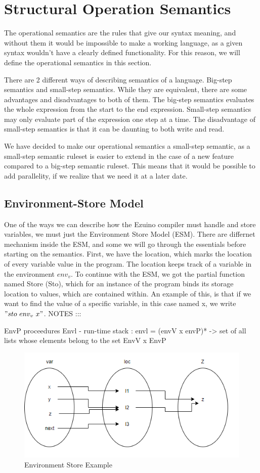\section{Structural Operation Semantics}
The operational semantics are the rules that give our syntax meaning, and without them it would be impossible to make a working language, as a given syntax wouldn't have a clearly defined functionality. For this reason, we will define the operational semantics in this section.

There are 2 different ways of describing semantics of a language. Big-step semantics and small-step semantics. While they are equivalent, there are some advantages and disadvantages to both of them. The big-step semantics evaluates the whole expression from the start to the end expression. Small-step semantics may only evaluate part of the expression one step at a time. The disadvantage of small-step semantics is that it can be daunting to both write and read.

We have decided to make our operational semantics a small-step semantic, as a small-step semantic ruleset is easier to extend in the case of a new feature compared to a big-step semantic ruleset. This means that it would be possible to add parallelity, if we realize that we need it at a later date.

\subsection{Environment-Store Model}
One of the ways we can describe how the Ezuino compiler must handle and store variables, we must just the Environment Store Model (ESM). There are differnet mechanism inside the ESM, and some we will go through the essentials before starting on the semantics. First, we have the location, which marks the location of every variable value in the program. The location keeps track of a variable in the environment $env_v$.
To continue with the ESM, we got the partial function named Store (Sto), which for an instance of the program binds its storage location to values, which are contained within. An example of this, is that if we want to find the value of a specific variable, in this case named x, we write $"sto \  env_v \ x"$.
NOTES :::

EnvP proceedures
Envl - run-time stack : envl = (envV x envP)* -> set of all lists whose elements belong to the set EnvV x EnvP 
\begin{figure}[H]
\centering
\includegraphics[scale=0.75]{figures/evnstore.png}
\caption{Environment Store Example}
\label{evnstoreexmp}
\end{figure}


